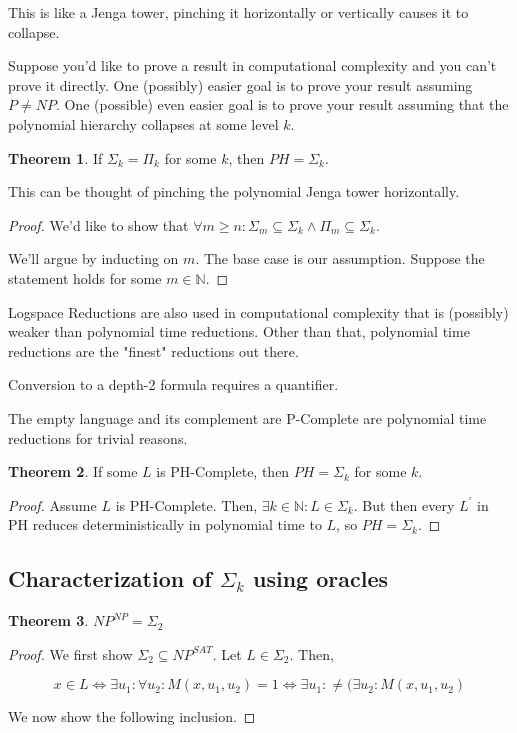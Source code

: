\documentclass{article}
\theoremstyle{definition}
\newtheorem{theorem}{Theorem}[section]
\begin{document}
This is like a Jenga tower, pinching it horizontally or vertically causes it to collapse.

Suppose you'd like to prove a result in computational complexity and you can't prove it directly. One (possibly) easier goal is to prove your result assuming $P \neq NP$. One (possible) even easier goal is to prove your result assuming that the polynomial hierarchy collapses at some level $k$.

\begin{theorem}
    If $\Sigma_{k} = \Pi_{k}$ for some $k$, then $PH = \Sigma_{k}$.
\end{theorem}

This can be thought of pinching the polynomial Jenga tower horizontally.

\begin{proof}
    We'd like to show that $\forall m \geq n: \Sigma_m \subseteq \Sigma_k \land \Pi_{m} \subseteq \Sigma_{k}$.

    We'll argue by inducting on $m$. The base case is our assumption. Suppose the statement holds for some $m \in \mathbb{N}$. 
\end{proof}


Logspace Reductions are also used in computational complexity that is (possibly) weaker than polynomial time reductions. Other than that, polynomial time reductions are the "finest" reductions out there.

Conversion to a depth-2 formula requires a quantifier.

The empty language and its complement are P-Complete are polynomial time reductions for trivial reasons.

\begin{theorem}
    If some $L$ is PH-Complete, then $PH = \Sigma_{k}$ for some $k$.
\end{theorem}
\begin{proof}
    Assume $L$ is PH-Complete. Then, $\exists k \in \mathbb{N}: L \in \Sigma_{k}$. But then every $L^{\prime}$ in PH reduces deterministically in polynomial time to $L$, so $PH = \Sigma_{k}$.
\end{proof}

\subsection{Characterization of $\Sigma_{k}$ using oracles}

\begin{theorem}
    $NP^{NP} = \Sigma_{2}$
\end{theorem}
\begin{proof}
    We first show $\Sigma_{2} \subseteq NP^{SAT}$. Let $L \in \Sigma_{2}$. Then, 

    \[ x \in L \iff \exists u_{1}: \forall u_{2}: M(x,u_{1},u_{2}) = 1 \iff \exists u_{1}: \neq (\exists u_{2}: M(x,u_{1},u_{2})\]

    We now show the following inclusion. 

    
\end{proof}
\end{document}
